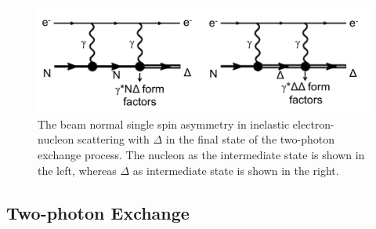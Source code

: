 

\begin{figure}[!h]
	\begin{center}
	\includegraphics[width=15.0cm]{figures/Im2Gamma}
	\end{center}
	\caption
	{The beam normal single spin asymmetry in inelastic electron-nucleon scattering with $\Delta$ in the final state of the two-photon exchange process. The nucleon as the intermediate state is shown in the left, whereas $\Delta$ as intermediate state is shown in the right.}
	\label{fig:Im2Gamma}
\end{figure}

\subsection{Two-photon Exchange}
\label{Two-photon Exchange}

